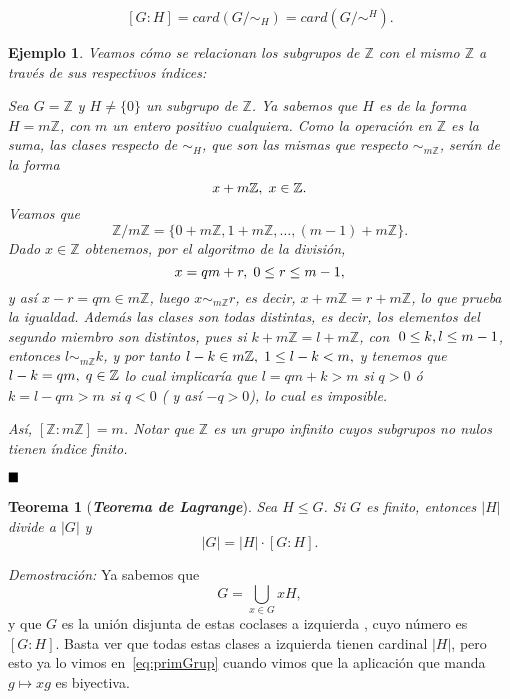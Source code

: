 \documentclass[12pt]{article}
\newtheorem{theorem}{Teorema}[section]
\newtheorem{example}{Ejemplo}[theorem]
\begin{document}
$$[G:H] = card(G/\sim_{H}) = card(G/\sim^{H}).$$

\begin{example} Veamos cómo se relacionan los subgrupos de $\mathbb{Z}$ con el mismo $\mathbb{Z}$ a través de sus respectivos índices:

Sea $G = \mathbb{Z}$ y $H \neq \lbrace 0 \rbrace$ un subgrupo de $\mathbb{Z}$. Ya sabemos que $H$ es de la forma $H = m\mathbb{Z}$, con $m$ un entero positivo cualquiera. Como la operación en $\mathbb{Z}$ es la \textit{suma}, las clases respecto de $\sim_{H}$, que son las mismas que respecto $\sim_{m\mathbb{Z}}$, serán de la forma $$x+ m\mathbb{Z}, \hspace{0.1cm} x \in \mathbb{Z}.$$ Veamos que $$\mathbb{Z}/m\mathbb{Z} = \lbrace 0+m\mathbb{Z},1+ m\mathbb{Z}, \ldots,(m-1)+ m\mathbb{Z}\rbrace.$$ Dado $x \in \mathbb{Z}$ obtenemos, por el algoritmo de la división, $$x = qm + r, \hspace{0.1cm} 0\leq r\leq m-1,$$y así $x-r = qm \in m\mathbb{Z}$, luego $x\sim_{m\mathbb{Z}}r$, es decir, $x+m\mathbb{Z}=r+ m\mathbb{Z}$, lo que prueba la igualdad. Además las clases son todas distintas, es decir, los elementos del segundo miembro son distintos, pues si $k+m\mathbb{Z} =l+ m\mathbb{Z}$, con $\hspace{0.1cm} 0\leq k,l \leq m-1$, entonces $l\sim_{m\mathbb{Z}}k$, y por tanto $l-k \in m\mathbb{Z}, \hspace{0.1cm} 1\leq l-k <m,$ y tenemos que $l-k = qm, \hspace{0.1cm} q \in \mathbb{Z}$ lo cual implicaría que $l = qm +k > m$ si $q>0$ ó $k = l - qm >m$ si $q < 0$ ( y así $-q >0$), lo cual es imposible.

Así, $\left[ \mathbb{Z}:m\mathbb{Z} \right] = m$. Notar que $\mathbb{Z}$ es un grupo infinito cuyos subgrupos no nulos tienen índice finito.
\end{example}
$\hfill \blacksquare$

\begin{theorem}[\textbf{\textit{Teorema de Lagrange}}]
Sea $H \leq G$. Si $G$ es finito, entonces $|H|$ divide a $|G|$ y $$|G| = |H|\cdot \left[ G:H \right].$$
\end{theorem}
\emph{Demostración: }Ya sabemos que $$G = \bigcup_{x\in G} xH,$$ y que $G$ es la unión disjunta de estas coclases a izquierda , cuyo número es $[G:H]$. Basta ver que todas estas clases a izquierda tienen cardinal $|H|$, pero esto ya lo vimos en~\ref{eq:primGrup} cuando vimos que la aplicación que manda $g \longmapsto xg$ es biyectiva.
\end{document}
